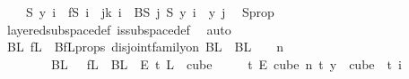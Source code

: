 \begin{isabellebody}
\ \ \ \ S\ y\ i\ {\isacharequal}{\kern0pt}\ fS\ i{\isacharparenright}{\kern0pt}\ {\isasymand}\ {\isacharparenleft}{\kern0pt}{\isasymforall}j{\isacharless}{\kern0pt}k{\isachardot}{\kern0pt}\ {\isasymforall}i\ {\isasymin}\ BS\ j{\isachardot}{\kern0pt}\ {\isacharparenleft}{\kern0pt}S\ y{\isacharparenright}{\kern0pt}\ i\ {\isacharequal}{\kern0pt}\ y\ j{\isacharparenright}{\kern0pt}{\isacharparenright}{\kern0pt}{\isachardoublequoteclose}\ \isamarkupfalse%
\ S{\isacharunderscore}{\kern0pt}prop\isanewline
\ \ \ \ \ \ \isamarkupfalse%
\ layered{\isacharunderscore}{\kern0pt}subspace{\isacharunderscore}{\kern0pt}def\ is{\isacharunderscore}{\kern0pt}subspace{\isacharunderscore}{\kern0pt}def\ \isamarkupfalse%
\ auto\isanewline
\isanewline
\ \ \ \ \isamarkupfalse%
\ BL\ fL\ \ BfL{\isacharunderscore}{\kern0pt}props{\isacharcolon}{\kern0pt}\ {\isachardoublequoteopen}disjoint{\isacharunderscore}{\kern0pt}family{\isacharunderscore}{\kern0pt}on\ BL\ {\isacharbraceleft}{\kern0pt}{\isachardot}{\kern0pt}{\isachardot}{\kern0pt}{}{\isacharbraceright}{\kern0pt}{\isachardoublequoteclose}\ {\isachardoublequoteopen}{\isasymUnion}{\isacharparenleft}{\kern0pt}BL\ {\isacharbackquote}{\kern0pt}\ {\isacharbraceleft}{\kern0pt}{\isachardot}{\kern0pt}{\isachardot}{\kern0pt}{}{\isacharbraceright}{\kern0pt}{\isacharparenright}{\kern0pt}\ {\isacharequal}{\kern0pt}\ {\isacharbraceleft}{\kern0pt}{\isachardot}{\kern0pt}{\isachardot}{\kern0pt}{\isacharless}{\kern0pt}n{\isacharbraceright}{\kern0pt}{\isachardoublequoteclose}\isanewline
\ \ \ \ \ \ {\isachardoublequoteopen}{\isacharparenleft}{\kern0pt}{\isacharbraceleft}{\kern0pt}{\isacharbraceright}{\kern0pt}\ {\isasymnotin}\ BL\ {\isacharbackquote}{\kern0pt}\ {\isacharbraceleft}{\kern0pt}{\isachardot}{\kern0pt}{\isachardot}{\kern0pt}{\isacharless}{\kern0pt}{}{\isacharbraceright}{\kern0pt}{\isacharparenright}{\kern0pt}{\isachardoublequoteclose}\ {\isachardoublequoteopen}fL\ {\isasymin}\ {\isacharparenleft}{\kern0pt}BL\ {}{\isacharparenright}{\kern0pt}\ {\isasymrightarrow}\isactrlsub E\ {\isacharbraceleft}{\kern0pt}{\isachardot}{\kern0pt}{\isachardot}{\kern0pt}{\isacharless}{\kern0pt}t{\isacharplus}{\kern0pt}{}{\isacharbraceright}{\kern0pt}{\isachardoublequoteclose}\ {\isachardoublequoteopen}L\ {\isasymin}\ {\isacharparenleft}{\kern0pt}cube\ {}\isanewline
\ \ \ \ {\isacharparenleft}{\kern0pt}t{\isacharplus}{\kern0pt}{}{\isacharparenright}{\kern0pt}{\isacharparenright}{\kern0pt}\ {\isasymrightarrow}\isactrlsub E\ {\isacharparenleft}{\kern0pt}cube\ n\ {\isacharparenleft}{\kern0pt}t{\isacharplus}{\kern0pt}{}{\isacharparenright}{\kern0pt}{\isacharparenright}{\kern0pt}{\isachardoublequoteclose}\ {\isachardoublequoteopen}{\isacharparenleft}{\kern0pt}{\isasymforall}y\ {\isasymin}\ cube\ {}\ {\isacharparenleft}{\kern0pt}t{\isacharplus}{\kern0pt}{}{\isacharparenright}{\kern0pt}{\isachardot}{\kern0pt}\ {\isacharparenleft}{\kern0pt}{\isasymforall}i\ {\isasymin}\isanewline

\end{isabellebody}
